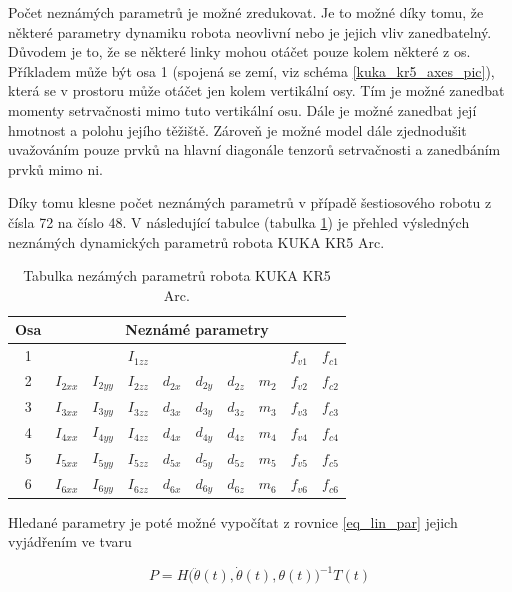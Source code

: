 Počet neznámých parametrů je možné zredukovat. Je to možné díky tomu, že některé parametry dynamiku robota neovlivní nebo je jejich vliv zanedbatelný. Důvodem je to, že se některé linky mohou otáčet pouze kolem některé z os. Příkladem může být osa 1 (spojená se zemí, viz schéma \ref{kuka_kr5_axes_pic}), která se v prostoru může otáčet jen kolem vertikální osy. Tím je možné zanedbat momenty setrvačnosti mimo tuto vertikální osu. Dále je možné zanedbat její hmotnost a polohu jejího těžiště. Zároveň je možné model dále zjednodušit uvažováním pouze prvků na hlavní diagonále tenzorů setrvačnosti a zanedbáním prvků mimo ni.

Díky tomu klesne počet neznámých parametrů v případě šestiosového robotu z čísla 72 na číslo 48. V následující tabulce (tabulka \ref{tab_hled_param}) je přehled výsledných neznámých dynamických parametrů robota KUKA KR5 Arc.
\\

\begin{table}[ht]
  \centering
  \caption{Tabulka nezámých parametrů robota KUKA KR5 Arc.}
    \begin{tabular}{c|lllllllll}
    \multicolumn{1}{c|}{Osa} & \multicolumn{9}{c}{Neznámé parametry}  \\
    \hline
    1 &       	  &	          & $I_{1zz}$ &          &          &          & & $f_{v1}$ & $f_{c1}$ \\
    2 & $I_{2xx}$ & $I_{2yy}$ & $I_{2zz}$ & $d_{2x}$ & $d_{2y}$ & $d_{2z}$ & $m_{2}$ & $f_{v2}$ & $f_{c2}$ \\
    3 & $I_{3xx}$ & $I_{3yy}$ & $I_{3zz}$ & $d_{3x}$ & $d_{3y}$ & $d_{3z}$ & $m_{3}$ & $f_{v3}$ & $f_{c3}$ \\
    4 & $I_{4xx}$ & $I_{4yy}$ & $I_{4zz}$ & $d_{4x}$ & $d_{4y}$ & $d_{4z}$ & $m_{4}$ & $f_{v4}$ & $f_{c4}$ \\
    5 & $I_{5xx}$ & $I_{5yy}$ & $I_{5zz}$ & $d_{5x}$ & $d_{5y}$ & $d_{5z}$ & $m_{5}$ & $f_{v5}$ & $f_{c5}$ \\
    6 & $I_{6xx}$ & $I_{6yy}$ & $I_{6zz}$ & $d_{6x}$ & $d_{6y}$ & $d_{6z}$ & $m_{6}$ & $f_{v6}$ & $f_{c6}$ \\
    \end{tabular}%
  \label{tab_hled_param}%
\end{table}%

Hledané parametry je poté možné vypočítat z rovnice \ref{eq_lin_par} jejich vyjádřením ve tvaru

\begin{equation}
P = H\big(\ddot{\theta}(t),\dot{\theta}(t),\theta(t)\big)^{-1}T(t)
\label{eq_lin_par_inv}
\end{equation}

